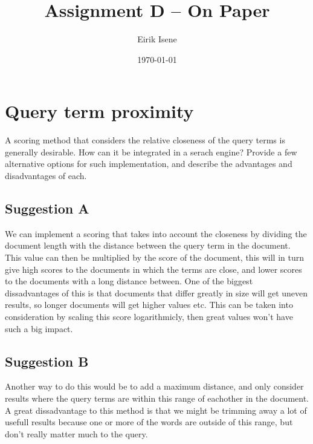 \documentclass{article}
\title{Assignment D -- On Paper}
\author{Eirik Isene}
\date{\today}
\begin{document}
\maketitle

\section{Query term proximity}

A scoring method that considers the relative closeness of the query terms is generally desirable. How can it be integrated in a serach engine? Provide a few alternative options for such implementation, and describe the advantages and disadvantages of each.

\subsection{Suggestion A}
We can implement a scoring that takes into account the closeness by dividing the document length with the distance between the query term in the document. This value can then be multiplied by the score of the document, this will in turn give high scores to the documents in which the terms are close, and lower scores to the documents with a long distance between. One of the biggest dissadvantages of this is that documents that differ greatly in size will get uneven results, so longer documents will get higher values etc. This can be taken into consideration by scaling this score logarithmicly, then great values won't have such a big impact.

\subsection{Suggestion B}
Another way to do this would be to add a maximum distance, and only consider results where the query terms are within this range of eachother in the document. A great dissadvantage to this method is that we might be trimming away a lot of usefull results because one or more of the words are outside of this range, but don't really matter much to the query.
\end{document}
